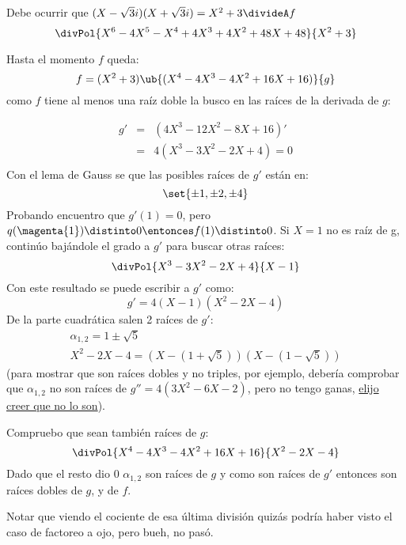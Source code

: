 \begin{enumerate}[label=\alph*)]
        Debe ocurrir que $(X - \sqrt{3}i)(X + \sqrt{3}i) = X^2 + 3 \divideA f$
        $$
          \divPol{X^6 - 4X^5 - X^4 + 4X^3 + 4X^2 + 48X + 48}{X^2 + 3}
        $$

        Hasta el momento $f$ queda:
        $$
          f = (X^2 + 3)\ub{(X^4 - 4X^3 - 4X^2 + 16X + 16)}{g}
        $$
        como $f$ tiene al menos una raíz doble la busco en las raíces de la derivada de $g$:\par
        $$
          \begin{array}{rcl}
            g' & = & (4X^3 - 12X^2 - 8 X + 16)' \\
               & = & 4(X^3 - 3X^2 - 2X + 4) = 0 \\
          \end{array}
        $$
        Con el lema de Gauss se que las posibles raíces de $g'$ están en:
        $$
          \set{\pm1,\pm2,\pm4}
        $$
        Probando encuentro que  $g'(1) = 0$, pero $q(\magenta{1}) \distinto 0 \entonces f(1) \distinto 0$. Si $X=1$ no es raíz de g,
        continúo bajándole el grado a $g'$ para buscar otras raíces:
        $$
          \divPol{X^3 - 3X^2 - 2X + 4}{X - 1}
        $$
        Con este resultado se puede escribir a $g'$ como:
        $$
          g' = 4(X-1)(X^2 - 2X -4)
        $$
        De la parte cuadrática salen 2 raíces de $g'$:
        $$
          \begin{array}{c}
            \alpha_{1,2} = 1 \pm \sqrt{5} \\
            X^2 - 2X -4 = (X - (1 + \sqrt{5}))(X - (1 - \sqrt{5}))
          \end{array}
        $$
        {\tiny(para mostrar que son raíces dobles y no triples, por ejemplo, debería comprobar que $\alpha_{1,2}$ no son raíces de $g''=4(3X^2-6X-2)$, pero no tengo ganas,
            \href{\dontWorryAboutAThing}{elijo creer que no lo son}).}

        Compruebo que sean también raíces de $g$:
        $$
          \divPol{X^4 - 4X^3 - 4X^2 + 16X + 16}{X^2 - 2X -4}
        $$
        Dado que el resto dio 0 $\alpha_{1,2}$ son raíces de $g$ y como son raíces de $g'$ entonces son raíces dobles de $g$, y de $f$.

        Notar que viendo el cociente de esa última división quizás podría haber visto el caso de factoreo a ojo, pero bueh, no pasó.


\end{enumerate}
